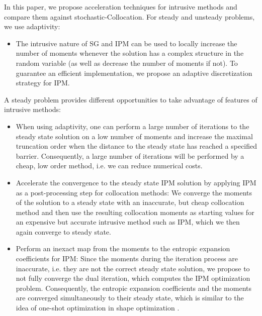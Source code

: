 In this paper, we propose acceleration techniques for intrusive methods and compare them against stochastic-Collocation. For steady and unsteady problems, we use adaptivity:
\begin{itemize}
\item The intrusive nature of SG and IPM can be used to locally increase the number of moments whenever the solution has a complex structure in the random variable (as well as decrease the number of moments if not). To guarantee an efficient implementation, we propose an adaptive discretization strategy for IPM.
\end{itemize}
A steady problem provides different opportunities to take advantage of features of intrusive methods: 
\begin{itemize}
\item When using adaptivity, one can perform a large number of iterations to the steady state solution on a low number of moments and increase the maximal truncation order when the distance to the steady state has reached a specified barrier. Consequently, a large number of iterations will be performed by a cheap, low order method, i.e. we can reduce numerical costs. 
\item Accelerate the convergence to the steady state IPM solution by applying IPM as a post-processing step for collocation methods: We converge the moments of the solution to a steady state with an inaccurate, but cheap collocation method and then use the resulting collocation moments as starting values for an expensive but accurate intrusive method such as IPM, which we then again converge to steady state. 
\item Perform an inexact map from the moments to the entropic expansion coefficients for IPM: Since the moments during the iteration process are inaccurate, i.e. they are not the correct steady state solution, we propose to not fully converge the dual iteration, which computes the IPM optimization problem. Consequently, the entropic expansion coefficients and the moments are converged simultaneously to their steady state, which is similar to the idea of one-shot optimization in shape optimization \cite{hazra2005aerodynamic}.
\end{itemize}

